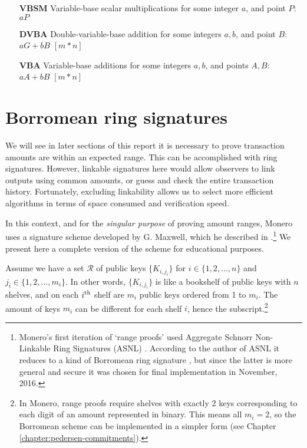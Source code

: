 \begin{itemize}
    \setlength\itemsep{\listspace}
    \item [\textbf{VBSM}] Variable-base scalar multiplications for some integer $a$, and point $P$: $a P$ \quad [m]
    \item [\textbf{DVBA}] Double-variable-base addition for some integers $a, b$, and point $B$: $a G + b B$ \quad \([m*n]\)
    \item [\textbf{VBA}] Variable-base additions for some integers $a, b$, and points $A, B$: $a A + b B$ \quad \([m*n]\)
\end{itemize}


\section{Borromean ring signatures}
\label{sec:borromean}

We will see in later sections of this report it is necessary to prove transaction amounts are within an expected range. This can be accomplished with ring signatures. However, linkable signatures here would allow observers to link outputs using common amounts, or guess and check the entire transaction history. Fortunately, excluding linkability allows us to select more efficient algorithms in terms of space consumed and verification speed.

In this context, and for the {\em singular purpose} of proving amount ranges, Monero uses a signature scheme developed by G. Maxwell, which he described in \cite{Signatures2015BorromeanRS}.\footnote{\label{asnl_note}Monero’s first iteration of `range proofs’ used Aggregate Schnorr Non-Linkable Ring Signatures (ASNL) \cite{MRL-0005}. According to the author of ASNL it reduces to a kind of Borromean ring signature \cite{ASNL-issue}, but since the latter is more general and secure it was chosen for final implementation in November, 2016.} We present here a complete version of the scheme for educational purposes.

Assume we have a set $\mathcal{R}$ of public keys $\{K_{i,j_i}\}$ for $i \in \{1,2,...,n\}$ and $j_i \in \{1, 2, ..., m_i\}$. In other words, $\{K_{i,j_i}\}$ is like a bookshelf of public keys with $n$ shelves, and on each $i\textsuperscript{th}$ shelf are $m_i$ public keys ordered from 1 to $m_i$. The amount of keys $m_i$ can be different for each shelf $i$, hence the subscript.\footnote{In Monero, range proofs require shelves with exactly 2 keys corresponding to each digit of an amount represented in binary. This means all $m_i = 2$, so the Borromean scheme can be implemented in a simpler form (see Chapter \ref{chapter:pedersen-commitments}).}

